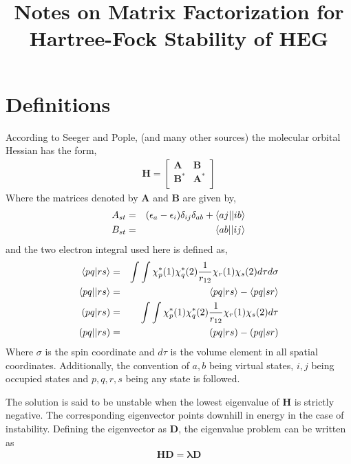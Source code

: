 \documentclass{revtex4}
\newcommand{\e}{\textcolor{myred}{\left(\epsilon_a-\epsilon_i\right)}}
\newcommand{\diag}{\textcolor{myred}{\delta_{ij}\delta_{ab}}}
\begin{document}
\title{Notes on Matrix Factorization for Hartree-Fock Stability of HEG}
\maketitle

\section{Definitions}
According to Seeger and Pople\cite{Seeger1977}, (and many other sources) the molecular orbital
Hessian has the form,
\begin{eqnarray}\label{basic}
\mathbf{H} =
  \begin{bmatrix}
    \mathbf{A}   & \mathbf{B}   \\
    \mathbf{B^*} & \mathbf{A^*} \\
  \end{bmatrix}
\end{eqnarray}
Where the matrices denoted by $\mathbf{A}$ and $\mathbf{B}$ are given by,
\begin{eqnarray}
  A_{st} &=& \e\diag +  \textcolor{myred}{\braket{aj||ib}} \\
  B_{st} &=& \textcolor{myblue}{\braket{ab||ij}}         
\end{eqnarray}
and the two electron integral used here is defined as, 
\begin{eqnarray}
  \braket{pq|rs} &=& \int\int \chi^*_p(1) \chi^*_q(2) \frac{1}{r_{12}} \chi_r(1) 
  \chi_s(2)
  d\tau d\sigma \\
  \braket{pq||rs} &=& \braket{pq|rs} - \braket{pq|sr} \\
  (pq|rs) &=& \int\int \chi^*_p(1) \chi^*_q(2) \frac{1}{r_{12}} \chi_r(1) 
  \chi_s(2)
  d\tau \\
  (pq||rs) &=& (pq|rs) - (pq|sr)
\end{eqnarray}
Where $\sigma$ is the spin coordinate and $d\tau$ is the volume element in all spatial coordinates.
Additionally, the convention of $a, b$ being virtual states, $i, j$ being occupied states and 
$p, q, r, s$ being any state is followed.  

The solution is said to be unstable when the lowest eigenvalue of $\mathbf{H}$
is strictly negative. The
corresponding eigenvector points downhill in energy in the case of instability. Defining
the eigenvector as $\mathbf{D}$, the eigenvalue problem can be written as
\begin{eqnarray}
  \mathbf{HD = \lambda D}
\end{eqnarray}
\end{document}
